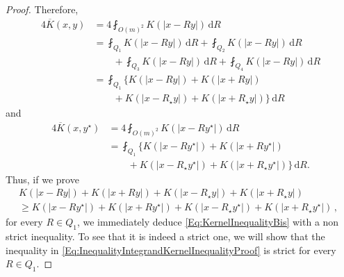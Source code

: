\documentclass[12pt,reqno]{amsart}
\theoremstyle{definition}
\theoremstyle{remark}
\renewcommand{\d}{\,\mathrm{d}} %
\newcommand{\average}{\fint}
\numberwithin{equation}{section}
\begin{document}
\begin{proof}
	Therefore,
	\begin{align*}
	4\overline{K} (x, y) &= 4\average_{O(m)^2} K(|x - R y|)\d R \\
	& = \average_{Q_1} K(|x - R y|)\d R + \average_{Q_2} K(|x - R y|)\d R \\
	& \quad \quad
	+ \average_{Q_3} K(|x - R y|)\d R +
	\average_{Q_4} K(|x - R y|)\d R \\
	&= \average_{Q_1} \{K(|x - R y|) + K(|x + R y|) \\
	&\quad \quad + K(|x - R_\star y|) + K(|x + R_\star y|)\}\d R
	\end{align*}
	and
	\begin{align*}
	4\overline{K} (x, y^\star) &= 4\average_{O(m)^2} K(|x - R y^\star|)\d R \\
	& = \average_{Q_1} \{K(|x - R y^\star|) + K(|x + R y^\star|) \\
	&\quad \quad + K(|x - R_\star y^\star|) + K(|x + R_\star y^\star|)\}\d R.
	\end{align*}
	Thus, if we prove
	\begin{equation}
	\label{Eq:InequalityIntegrandKernelInequalityProof}
	\begin{split}
	K(|x - R y|) + K(|x + R y|) + K(|x - R_\star y|) + K(|x + R_\star y|)
	\quad \quad \quad \quad 
	\\
	\geq
	K(|x - R y^\star|) + K(|x + R y^\star|)+K(|x - R_\star y^\star|) + K(|x + R_\star y^\star|)\,,
	\end{split}
	\end{equation}
	for every $R\in Q_1$, we immediately deduce \eqref{Eq:KernelInequalityBis} with a non strict inequality. To see that it is indeed a strict one, we will show that the inequality in \eqref{Eq:InequalityIntegrandKernelInequalityProof} is strict for every $R \in Q_1$.
	

\end{proof}
\end{document}
